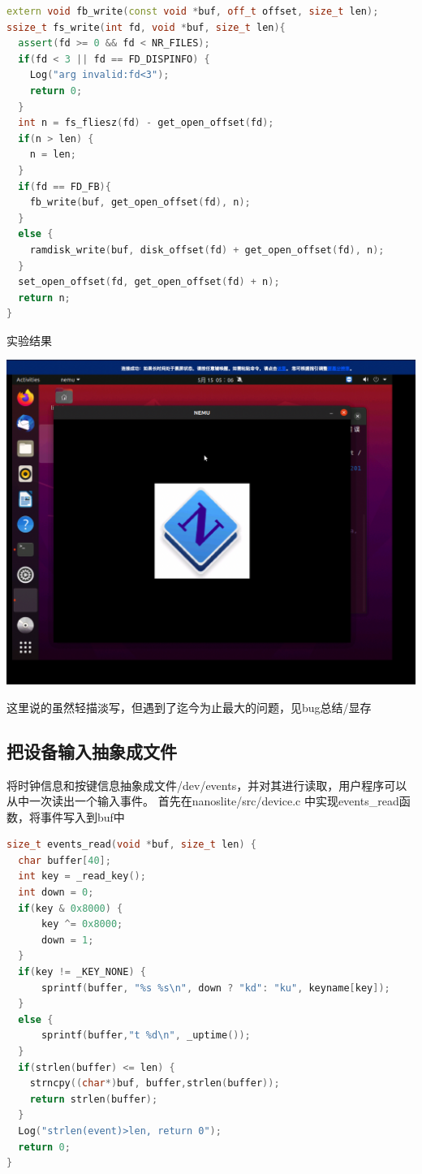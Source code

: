 \documentclass[UTF8,a4paper,10pt]{ctexart}
\begin{document}
\begin{lstlisting}[language = C++]
extern void fb_write(const void *buf, off_t offset, size_t len);
ssize_t fs_write(int fd, void *buf, size_t len){
  assert(fd >= 0 && fd < NR_FILES);
  if(fd < 3 || fd == FD_DISPINFO) {
    Log("arg invalid:fd<3");
    return 0;
  }
  int n = fs_fliesz(fd) - get_open_offset(fd);
  if(n > len) {
    n = len;
  }
  if(fd == FD_FB){
    fb_write(buf, get_open_offset(fd), n);
  }
  else {
    ramdisk_write(buf, disk_offset(fd) + get_open_offset(fd), n);
  }
  set_open_offset(fd, get_open_offset(fd) + n);
  return n;
}
\end{lstlisting}
实验结果
\begin{center}
  \includegraphics*[scale = 0.2]{pic/5}
\end{center}
\color{red} 这里说的虽然轻描淡写，但遇到了迄今为止最大的问题，见bug总结/显存
\normalcolor

\subsection{把设备输入抽象成文件}
将时钟信息和按键信息抽象成文件/dev/events，并对其进行读取，用户程序可以从中一次读出一个输入事件。 首先在nanos­lite/src/device.c 中实现events\_read函数，将事件写入到buf中
\begin{lstlisting}[language = C++]
size_t events_read(void *buf, size_t len) {
  char buffer[40];
  int key = _read_key();
  int down = 0;
  if(key & 0x8000) {
      key ^= 0x8000;
      down = 1;
  }
  if(key != _KEY_NONE) {
      sprintf(buffer, "%s %s\n", down ? "kd": "ku", keyname[key]);
  }
  else {
      sprintf(buffer,"t %d\n", _uptime());
  }
  if(strlen(buffer) <= len) { 
    strncpy((char*)buf, buffer,strlen(buffer));
    return strlen(buffer);
  } 
  Log("strlen(event)>len, return 0");
  return 0;
}
\end{lstlisting}
\end{document}
